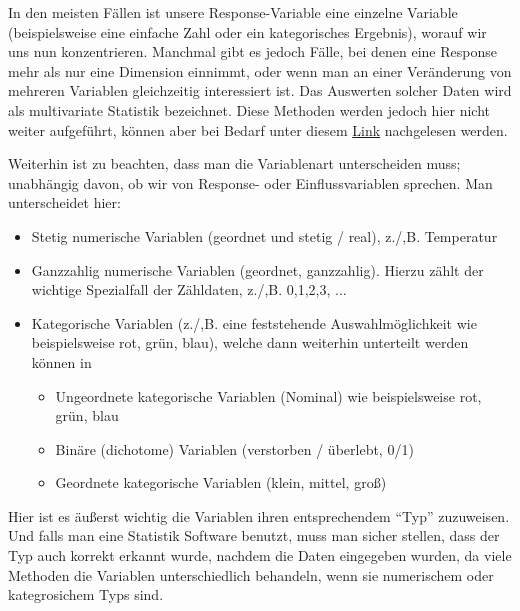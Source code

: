 \documentclass[a4paper,twoside]{tufte-book}\usepackage[]{graphicx}\usepackage[]{color}
\begin{document}
	In den  meisten Fällen ist unsere Response-Variable eine einzelne Variable (beispielsweise eine einfache Zahl oder ein kategorisches Ergebnis), worauf wir uns nun konzentrieren. Manchmal gibt es jedoch Fälle, bei denen eine Response mehr als nur eine Dimension einnimmt, oder wenn man an einer Veränderung von mehreren Variablen gleichzeitig interessiert ist. Das Auswerten solcher Daten wird als multivariate Statistik bezeichnet. Diese Methoden werden jedoch hier nicht weiter aufgeführt, können aber bei Bedarf unter diesem \href{http://biometry.github.io/APES/Stats/stats50-MultivariateStatistics.html}{Link} nachgelesen werden.
	
	Weiterhin ist zu beachten, dass man die Variablenart unterscheiden muss; unabhängig davon, ob wir von Response- oder Einflussvariablen sprechen. Man unterscheidet hier: 
	
	\begin{itemize}
		\item Stetig numerische Variablen (geordnet und stetig / real), z./,B. Temperatur
		\item Ganzzahlig numerische Variablen (geordnet, ganzzahlig). Hierzu zählt der wichtige Spezialfall der Zähldaten, z./,B. 0,1,2,3, ...
		\item Kategorische Variablen (z./,B. eine feststehende Auswahlmöglichkeit wie beispielsweise rot, grün, blau), welche dann weiterhin unterteilt werden können in 
		\begin{itemize}
			\item Ungeordnete kategorische Variablen (Nominal) wie beispielsweise rot, grün, blau
			\item Binäre (dichotome) Variablen (verstorben / überlebt, 0/1)
			\item Geordnete kategorische Variablen (klein, mittel, groß)
		\end{itemize}
	\end{itemize}
	
	Hier ist es äußerst wichtig die Variablen ihren entsprechendem ``Typ'' zuzuweisen. Und falls man eine Statistik Software benutzt, muss man sicher stellen, dass der Typ auch korrekt erkannt wurde, nachdem die Daten eingegeben wurden, da viele Methoden die Variablen unterschiedlich behandeln, wenn sie numerischem oder kategrosichem Typs sind.
	
\end{document}
